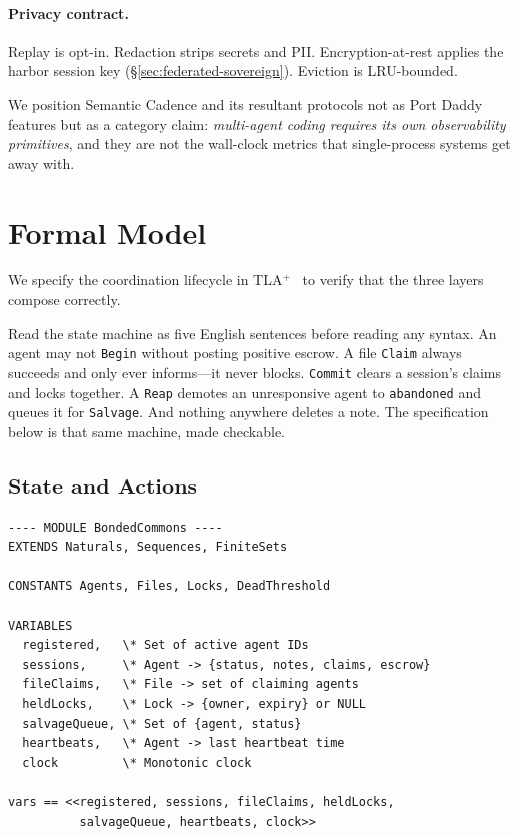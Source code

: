 \documentclass[11pt,a4paper]{article}
\theoremstyle{definition}
\theoremstyle{remark}
\begin{document}
\paragraph{Privacy contract.} Replay is opt-in. Redaction strips secrets and PII. Encryption-at-rest applies the harbor session key (\S\ref{sec:federated-sovereign}). Eviction is LRU-bounded.

We position Semantic Cadence and its resultant protocols not as Port Daddy features but as a category claim: \emph{multi-agent coding requires its own observability primitives}, and they are not the wall-clock metrics that single-process systems get away with.

\section{Formal Model}\label{sec:tlaplus}

We specify the coordination lifecycle in TLA$^{+}$~\cite{lamport2002specifying} to verify that the three layers compose correctly.

Read the state machine as five English sentences before reading any syntax. An agent may not \texttt{Begin} without posting positive escrow. A file \texttt{Claim} always succeeds and only ever informs---it never blocks. \texttt{Commit} clears a session's claims and locks together. A \texttt{Reap} demotes an unresponsive agent to \texttt{abandoned} and queues it for \texttt{Salvage}. And nothing anywhere deletes a note. The specification below is that same machine, made checkable.

\subsection{State and Actions}

\begin{lstlisting}[style=tlaplus, caption={TLA$^{+}$: State Variables}]
---- MODULE BondedCommons ----
EXTENDS Naturals, Sequences, FiniteSets

CONSTANTS Agents, Files, Locks, DeadThreshold

VARIABLES
  registered,   \* Set of active agent IDs
  sessions,     \* Agent -> {status, notes, claims, escrow}
  fileClaims,   \* File -> set of claiming agents
  heldLocks,    \* Lock -> {owner, expiry} or NULL
  salvageQueue, \* Set of {agent, status}
  heartbeats,   \* Agent -> last heartbeat time
  clock         \* Monotonic clock

vars == <<registered, sessions, fileClaims, heldLocks,
          salvageQueue, heartbeats, clock>>
\end{lstlisting}
\end{document}
